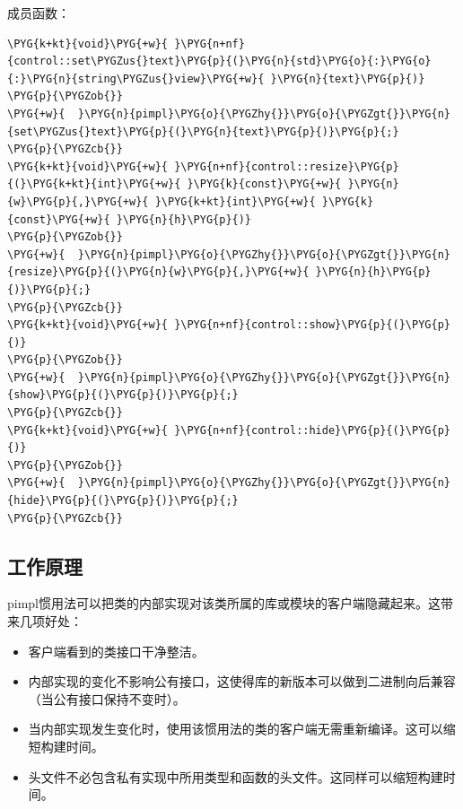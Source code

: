 
成员函数：



\begin{codeblockbg}
\begin{Verbatim}[commandchars=\\\{\},breaklines=true,breakanywhere=true,fontsize=\codefont,xleftmargin=17bp]
\PYG{k+kt}{void}\PYG{+w}{ }\PYG{n+nf}{control::set\PYGZus{}text}\PYG{p}{(}\PYG{n}{std}\PYG{o}{:}\PYG{o}{:}\PYG{n}{string\PYGZus{}view}\PYG{+w}{ }\PYG{n}{text}\PYG{p}{)}
\PYG{p}{\PYGZob{}}
\PYG{+w}{  }\PYG{n}{pimpl}\PYG{o}{\PYGZhy{}}\PYG{o}{\PYGZgt{}}\PYG{n}{set\PYGZus{}text}\PYG{p}{(}\PYG{n}{text}\PYG{p}{)}\PYG{p}{;}
\PYG{p}{\PYGZcb{}}
\PYG{k+kt}{void}\PYG{+w}{ }\PYG{n+nf}{control::resize}\PYG{p}{(}\PYG{k+kt}{int}\PYG{+w}{ }\PYG{k}{const}\PYG{+w}{ }\PYG{n}{w}\PYG{p}{,}\PYG{+w}{ }\PYG{k+kt}{int}\PYG{+w}{ }\PYG{k}{const}\PYG{+w}{ }\PYG{n}{h}\PYG{p}{)}
\PYG{p}{\PYGZob{}}
\PYG{+w}{  }\PYG{n}{pimpl}\PYG{o}{\PYGZhy{}}\PYG{o}{\PYGZgt{}}\PYG{n}{resize}\PYG{p}{(}\PYG{n}{w}\PYG{p}{,}\PYG{+w}{ }\PYG{n}{h}\PYG{p}{)}\PYG{p}{;}
\PYG{p}{\PYGZcb{}}
\PYG{k+kt}{void}\PYG{+w}{ }\PYG{n+nf}{control::show}\PYG{p}{(}\PYG{p}{)}
\PYG{p}{\PYGZob{}}
\PYG{+w}{  }\PYG{n}{pimpl}\PYG{o}{\PYGZhy{}}\PYG{o}{\PYGZgt{}}\PYG{n}{show}\PYG{p}{(}\PYG{p}{)}\PYG{p}{;}
\PYG{p}{\PYGZcb{}}
\PYG{k+kt}{void}\PYG{+w}{ }\PYG{n+nf}{control::hide}\PYG{p}{(}\PYG{p}{)}
\PYG{p}{\PYGZob{}}
\PYG{+w}{  }\PYG{n}{pimpl}\PYG{o}{\PYGZhy{}}\PYG{o}{\PYGZgt{}}\PYG{n}{hide}\PYG{p}{(}\PYG{p}{)}\PYG{p}{;}
\PYG{p}{\PYGZcb{}}
\end{Verbatim}
\end{codeblockbg}



\subsection{工作原理}



pimpl惯用法可以把类的内部实现对该类所属的库或模块的客户端隐藏起来。这带来几项好处：



\begin{itemize}
\item 客户端看到的类接口干净整洁。



\item 内部实现的变化不影响公有接口，这使得库的新版本可以做到二进制向后兼容（当公有接口保持不变时）。



\item 当内部实现发生变化时，使用该惯用法的类的客户端无需重新编译。这可以缩短构建时间。



\item 头文件不必包含私有实现中所用类型和函数的头文件。这同样可以缩短构建时间。

\end{itemize}


